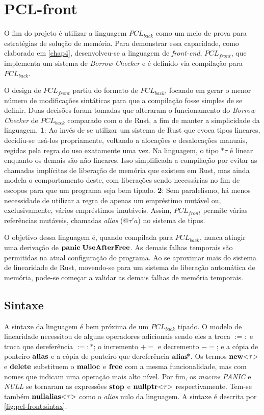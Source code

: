 \chapter{PCL-front}

O fim do projeto é utilizar a linguagem $PCL_{back}$ como um meio de prova para estratégias de solução de memória. Para demonstrar essa capacidade, como elaborado em \ref{chap4}, desenvolveu-se a linguagem de \emph{front-end}, $PCL_{front}$, que implementa um sistema de \emph{Borrow Checker} e é definido via compilação para $PCL_{back}$.

O design de $PCL_{front}$ partiu do formato de $PCL_{back}$, focando em gerar o menor número de modificações sintáticas para que a compilação fosse simples de se definir. Duas decisões foram tomadas que alteraram o funcionamento do \emph{Borrow Checker} de $PCL_{back}$ comparado com o de Rust, a fim de manter a simplicidade da linguagem. \textbf{1}: Ao invés de se utilizar um sistema de Rust que evoca tipos lineares, decidiu-se usá-los propriamente, voltando a alocações e desalocações manuais, regidas pela regra do uso exatamente uma vez. Na linguagem, o tipo $\text{*}\tau$ é linear enquanto os demais são não lineares. Isso simplificada a compilação por evitar as chamadas implícitas de liberação de memória que existem em Rust, mas ainda modela o comportamento deste, com liberações sendo necessárias no fim de escopos para que um programa seja bem tipado. \textbf{2}: Sem paralelismo, há menos necessidade de utilizar a regra de apenas um empréstimo mutável ou, exclusivamente, vários empréstimos imutáveis. Assim, $PCL_{front}$ permite várias referências mutáveis, chamadas \emph{alias} ($@\tau'a$) no sistema de tipos. 

O objetivo dessa linguagem é, quando compilada para $PCL_{back}$, nunca atingir uma derivação de $\mathbf{panic}\;\mathbf{UseAfterFree}$. As demais falhas temporais são permitidas na atual configuração do programa. Ao se aproximar mais do sistema de linearidade de Rust, movendo-se para um sistema de liberação automática de memória, pode-se começar a validar as demais falhas de memória temporais.

\section{Sintaxe}

A sintaxe da linguagem é bem próxima de um $PCL_{back}$ tipado. O modelo de linearidade necessitou de alguns operadores adicionais sendo eles a troca $:=:$ e troca que dereferência $:=:\!\text{*}$; o incremento $+=$ e decremento $-=$; e a cópia de ponteiro $\mathbf{alias}$ e a cópia de ponteiro que dereferência $\mathbf{alias}\!\text{*}$. Os termos $\mathbf{new}\text{<}\tau\text{>}$ e $\mathbf{delete}$ substituem o $\mathbf{malloc}$ e $\mathbf{free}$ com a mesma funcionalidade, mas com nomes que indicam uma operação mais alto nível. Por fim, os \emph{macros} \emph{PANIC} e \emph{NULL} se tornaram as expressões $\mathbf{stop}$ e $\mathbf{nullptr}\text{<}\tau\text{>}$ respectivamente. Tem-se também $\mathbf{nullalias}\text{<}\tau\text{>}$ como o \emph{alias} nulo da linguagem. A sintaxe é descrita por \ref{fig:pcl-front:sintax}.


